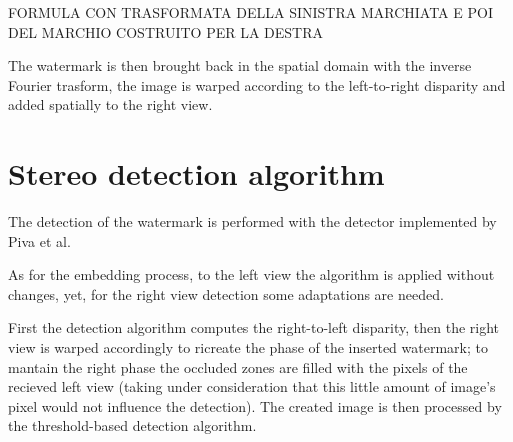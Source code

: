 FORMULA CON TRASFORMATA DELLA SINISTRA MARCHIATA E POI DEL MARCHIO COSTRUITO PER LA DESTRA

The watermark is then brought back in the spatial domain with the inverse Fourier trasform, the image is warped according to the left-to-right disparity and added spatially to the right view.

\section{Stereo detection algorithm}

The detection of the watermark is performed with the detector implemented by Piva et al.

As for the embedding process, to the left view the algorithm is applied without changes, yet, for the right view detection some adaptations are needed.

First the detection algorithm computes the right-to-left disparity, then the right view is warped accordingly to ricreate the phase of the inserted watermark; to mantain the right phase the occluded zones are filled with the pixels of the recieved left view (taking under consideration that this little amount of image's pixel would not influence the detection).
The created image is then processed by the threshold-based detection algorithm. 




